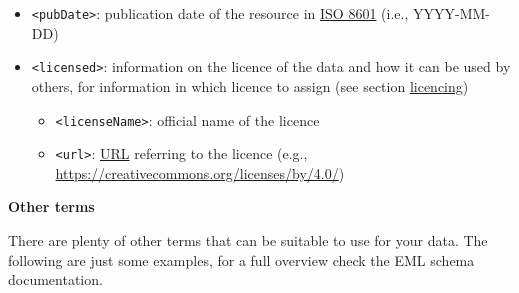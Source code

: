 \documentclass[
  oneside]{book}
\providecommand{\tightlist}{%
  \setlength{\itemsep}{0pt}\setlength{\parskip}{0pt}}
\begin{document}
\begin{itemize}
  \begin{itemize}
  \tightlist
  \item
    \texttt{\textless{}methodStep\textgreater{}}: can be repeated for each method step and includes a range of subterms to specify instruments, software, protocols, descriptions, and citations of the methods
  \end{itemize}
\item
  {\texttt{\textless{}pubDate\textgreater{}}}: publication date of the resource in \href{https://www.iso.org/iso-8601-date-and-time-format.html}{ISO 8601} (i.e., YYYY-MM-DD)
\item
  {\texttt{\textless{}licensed\textgreater{}}}: information on the licence of the data and how it can be used by others, for information in which licence to assign (see section \hyperref[Licencing]{licencing})

  \begin{itemize}
  \tightlist
  \item
    \texttt{\textless{}licenseName\textgreater{}}: official name of the licence
  \item
    \texttt{\textless{}url\textgreater{}}: \hyperref[URI]{URL} referring to the licence (e.g., \url{https://creativecommons.org/licenses/by/4.0/})
  \end{itemize}
\end{itemize}

{\textbf{Other terms}}

There are plenty of other terms that can be suitable to use for your data. The following are just some examples, for a full overview check the EML schema documentation.
\end{document}
